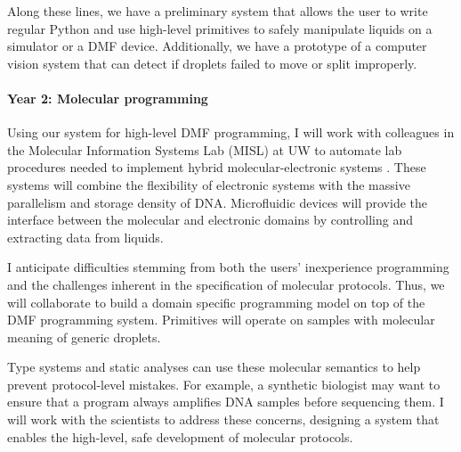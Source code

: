 \documentclass[12pt]{article}
\begin{document}

Along these lines, we have a preliminary system that allows the user to write regular Python and use high-level primitives to safely manipulate liquids on a simulator or a DMF device.
Additionally, we have a prototype of a computer vision system that can detect if droplets failed to move or split improperly.

\paragraph{Year 2: Molecular programming}

Using our system for high-level DMF programming, I will work with colleagues
in the Molecular Information Systems Lab (MISL) at UW to automate lab procedures needed to implement
hybrid molecular-electronic systems \cite{molecularelectronic}.
These systems will combine the flexibility of electronic systems with the massive parallelism and storage density of DNA.
Microfluidic devices will provide the interface between the molecular and electronic domains by controlling and extracting data from liquids.

I anticipate difficulties stemming from both the users' inexperience programming and the challenges inherent in the specification of molecular protocols.
Thus, we will collaborate to build a domain specific programming model on top of the DMF programming system.
Primitives will operate on samples with molecular meaning of generic droplets.

Type systems and static analyses can use these molecular semantics to help prevent protocol-level mistakes.
For example, a synthetic biologist may want to ensure that a program always amplifies DNA samples before sequencing them.
I will work with the scientists to address these concerns, designing a system that enables the high-level, safe development of molecular protocols.

\end{document}
